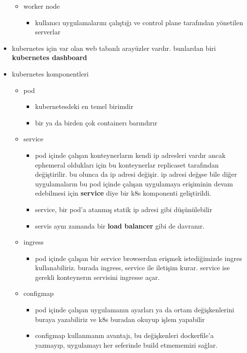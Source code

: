 \documentclass[14pt]{article}
\begin{document}
\begin{itemize}
\begin{itemize}
\item worker node
\begin{itemize}
\item kullanıcı uygulamalarını çalıştığı ve control plane tarafından yönetilen serverlar
\end{itemize}
\end{itemize}
\item kubernetes için var olan web tabanlı arayüzler vardır. bunlardan biri \textbf{kubernetes dashboard}
\item kubernetes komponentleri
\begin{itemize}
\item pod
\begin{itemize}
\item kubernetesdeki en temel birimdir
\item bir ya da birden çok containerı barındırır
\end{itemize}
\item service
\begin{itemize}
\item pod içinde çalışan konteynerların kendi ip adresleri vardır ancak ephemeral oldukları için bu konteynerlar replicaset tarafından değiştirilir. bu olunca da ip adresi değişir. ip adresi değşse bile diğer uygulamaların bu pod içinde çalışan uygulamaya erişiminin devam edebilmesi için \textbf{service} diye bir k8s komponenti geliştirildi.
\item service, bir pod'a atanmış statik ip adresi gibi düşünülebilir
\item servis aynı zamanda bir \textbf{load balancer} gibi de davranır.
\end{itemize}
\item ingress
\begin{itemize}
\item pod içinde çalışan bir service browserdan erişmek istediğimizde ingres kullanabiliriz. burada ingress, service ile iletişim kurar. service ise gerekli konteynerın servisini ingresse açar.
\end{itemize}
\item configmap
\begin{itemize}
\item pod içinde çalışan uygulamanın ayarları ya da ortam değişkenlerini buraya yazabiliriz ve k8s buradan okuyup işlem yapabilir
\item configmap kullanmanın avantajı, bu değişkenleri dockerfile'a yazmayıp, uygulamayı her seferinde build etmememizi sağlar.
\end{itemize}

\end{itemize}
\end{itemize}
\end{document}
